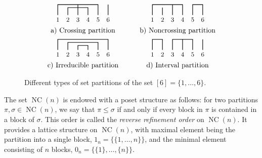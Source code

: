 \documentclass[pdftex]{sigma}%
\numberwithin{equation}{section}
\newcommand{\NC}{\operatorname{NC}}
\begin{document}
\begin{figure}[t]
$$
\begin{array}{c c c}
\begin{tikzpicture}[thick,font=\small]
 \path 	(0,0) 		node (a) {1}
 	(0.5,0) 	node (b) {2}
 	(1,0) 		node (c) {3}
 	(1.5,0) 	node (d) {4}
 	(2,0) 		node (e) {5}
	(2.5,0) 		node (f) {6};
 \draw (a) -- +(0,0.75) -| (e);
 \draw (b) -- +(0,0.60) -| (d);
 \draw (c) -- +(0,0.75) -| (c);
 \draw (f) -- +(0,0.75) -| (f);
 \end{tikzpicture}
 & \quad &
 \begin{tikzpicture}[thick,font=\small]
 \path 	(0,0) 		node (a) {1}
 	(0.5,0) 	node (b) {2}
 	(1,0) 		node (c) {3}
 	(1.5,0) 	node (d) {4}
 	(2,0) 		node (e) {5}
 	(2.5,0) 	node (f) {6};
 \draw (a) -- +(0,0.75) -| (d);
 \draw (c) -- +(0,0.75) -| (c);
 \draw (b) -- +(0,0.60) -| (b);
 \draw (e) -- +(0,0.75) -| (f);
 \end{tikzpicture}\\
 \mbox{a) Crossing partition}& \quad & \mbox{b) Noncrossing partition}\\[0.2cm]
 \begin{tikzpicture}[thick,font=\small]
 \path 	(0,0) 		node (a) {1}
 	(0.5,0) 	node (b) {2}
 	(1,0) 		node (c) {3}
 	(1.5,0) 	node (d) {4}
 	(2,0) 		node (e) {5}
 	(2.5,0) 	node (f) {6};
 \draw (a) -- +(0,0.75) -| (f);
 \draw (b) -- +(0,0.60) -| (e);
 \draw (c) -- +(0,0.45) -| (d);
 \end{tikzpicture}
 & \quad &
 \begin{tikzpicture}[thick,font=\small]
 \path 	(0,0) 		node (a) {1}
 	(0.5,0) 	node (b) {2}
 	(1,0) 		node (c) {3}
 	(1.5,0) 	node (d) {4}
 	(2,0) 		node (e) {5}
 	(2.5,0) 	node (f) {6};
 \draw (a) -- +(0,0.75) -| (b);
 \draw (c) -- +(0,0.75) -| (e);
 \draw (d) -- +(0,0.75) -| (d);
 \draw (f) -- +(0,0.75) -| (f);
 \end{tikzpicture}
 \\ \mbox{c) Irreducible partition} &\quad &\mbox{d) Interval partition}
\end{array}
$$
\caption{Different types of set partitions of the set $[6]=\{1,\dots,6\}$.}
\end{figure}

The set $\NC(n)$ is endowed with a poset structure as follows: for two partitions $\pi,\sigma \in \NC(n)$, we say that $\pi \leq \sigma$ if and only if every block in $\pi$ is contained in a block of $\sigma$. This order is called the \textit{reverse refinement order} on $\NC(n)$. It provides a lattice structure on $\NC(n)$, with maximal element being the partition into a single block, $1_n = \{\{1,\dots,n\}\}$, and the minimal element consisting of $n$ blocks, $0_n = \{ \{1\},\dots, \{n\}\}$.
\end{document}
